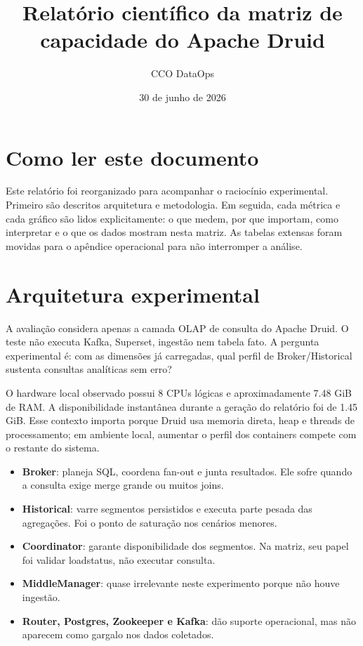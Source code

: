 \documentclass[11pt,a4paper]{article}
\title{Relatório científico da matriz de capacidade do Apache Druid}
\author{CCO DataOps}
\date{30 de junho de 2026}
\begin{document}
\maketitle


\section{Como ler este documento}

Este relatório foi reorganizado para acompanhar o raciocínio experimental. Primeiro são descritos arquitetura e metodologia. Em seguida, cada métrica e cada gráfico são lidos explicitamente: o que medem, por que importam, como interpretar e o que os dados mostram nesta matriz. As tabelas extensas foram movidas para o apêndice operacional para não interromper a análise.

\section{Arquitetura experimental}

A avaliação considera apenas a camada OLAP de consulta do Apache Druid. O teste não executa Kafka, Superset, ingestão nem tabela fato. A pergunta experimental é: com as dimensões já carregadas, qual perfil de Broker/Historical sustenta consultas analíticas sem erro?

O hardware local observado possui 8 CPUs lógicas e aproximadamente 7.48 GiB de RAM. A disponibilidade instantânea durante a geração do relatório foi de 1.45 GiB. Esse contexto importa porque Druid usa memoria direta, heap e threads de processamento; em ambiente local, aumentar o perfil dos containers compete com o restante do sistema.

\begin{itemize}

\item \textbf{Broker}: planeja SQL, coordena fan-out e junta resultados. Ele sofre quando a consulta exige merge grande ou muitos joins.

\item \textbf{Historical}: varre segmentos persistidos e executa parte pesada das agregações. Foi o ponto de saturação nos cenários menores.

\item \textbf{Coordinator}: garante disponibilidade dos segmentos. Na matriz, seu papel foi validar loadstatus, não executar consulta.

\item \textbf{MiddleManager}: quase irrelevante neste experimento porque não houve ingestão.

\item \textbf{Router, Postgres, Zookeeper e Kafka}: dão suporte operacional, mas não aparecem como gargalo nos dados coletados.

\end{itemize}
\end{document}
